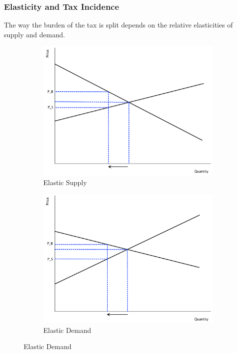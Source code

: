 \documentclass[11pt]{article}\usepackage[]{graphicx}\usepackage[]{color}
\theoremstyle{definition}
\begin{document}
	\subsubsection*{Elasticity and Tax Incidence}
	
	
	The way the burden of the tax is split depends on the relative elasticities of supply and demand. 
	
	\begin{figure}[H]
		\centering
		\caption{The Tax Burden}
		\begin{subfigure}{.5\textwidth}
			\includegraphics[scale=.25]{plot42.pdf}
			\caption{Elastic Supply}
		\end{subfigure}%
		\begin{subfigure}{.5\textwidth}
			\centering
			\includegraphics[scale=.25]{plot43.pdf}
			\caption{Elastic Demand}
		\end{subfigure}
	\end{figure}
	
\end{document}
